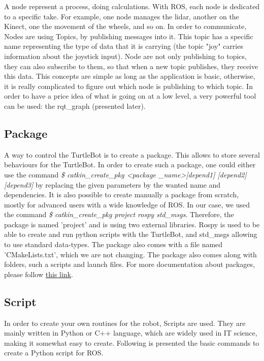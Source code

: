 \documentclass[aps,letterpaper,11pt]{revtex4}
\begin{document}
A node represent a process, doing calculations. With ROS, each node is dedicated to a specific take. For example, one node manages the lidar, another on the Kinect, one the movement of the wheels, and so on. In order to communicate, Nodes are using Topics, by publishing messages into it. This topic has a specific name representing the type of data that it is carrying (the topic "joy" carries information about the joystick input). Node are not only publishing to topics, they can also subscribe to them, so that when a new topic publishes, they receive this data. This concepts are simple as long as the application is basic, otherwise, it is really complicated to figure out which node is publishing to which topic. In order to have a price idea of what is going on at a low level, a very powerful tool can be used: the rqt\_graph (presented later).

\subsection{Package}

A way to control the TurtleBot is to create a package. This allows to store several behaviours for the TurtleBot. In order to create such a package, one could either use the command 
\textit{\$ catkin\_create\_pkg \textless package \_name\textgreater [depend1] [depend2] [depend3]} by replacing the given parameters by the wanted name and dependencies. It is also possible to create manually a package from scratch, mostly for advanced users with a wide knowledge of ROS. In our case, we used the command \textit{\$ catkin\_create\_pkg project rospy std\_msgs}. Therefore, the package is named 'project' and is using two external libraries. Rospy is used to be able to create and run python scripts with the TurtleBot, and std\_msgs allowing to use standard data-types. The package also comes with a file named 'CMakeLists.txt', which we are not changing. The package also comes along with folders, such a scripts and launch files. For more documentation about packages, please follow \href{ http://wiki.ros.org/Packages}{this link}.

\subsection{Script}

In order to create your own routines for the robot, Scripts are used. They are mainly written in Python or C++ language, which are widely used in IT science, making it somewhat easy to create. Following is presented the basic commands to create a Python script for ROS.
\end{document}
